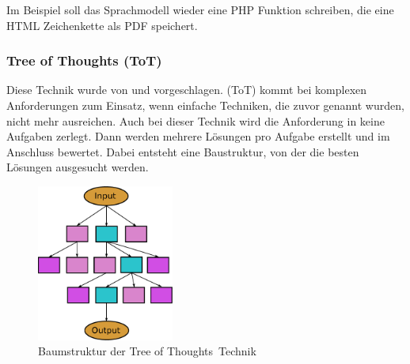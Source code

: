 Im Beispiel soll das Sprachmodell wieder eine PHP Funktion schreiben, die eine HTML Zeichenkette als PDF speichert.

















\subsubsection{Tree of Thoughts (ToT)}
Diese Technik wurde von \cite{long-2023} und \cite{yao-2023} vorgeschlagen. (\acrshort{ToT}) kommt bei komplexen Anforderungen zum Einsatz, wenn einfache Techniken, die zuvor genannt wurden, nicht mehr ausreichen. Auch bei dieser Technik wird die Anforderung in keine Aufgaben zerlegt. Dann werden mehrere Lösungen pro Aufgabe erstellt und im Anschluss bewertet. Dabei entsteht eine Baustruktur, von der die besten Lösungen ausgesucht werden.

\begin{figure}[!ht]
	\includegraphics[width=0.4\textwidth]{content/chapter_basics/images/tot_schema.eps}
	\centering
	\caption{Baumstruktur der \glqq Tree of Thoughts\grqq \ Technik}
	\label{img:tot_schema}
\end{figure}

